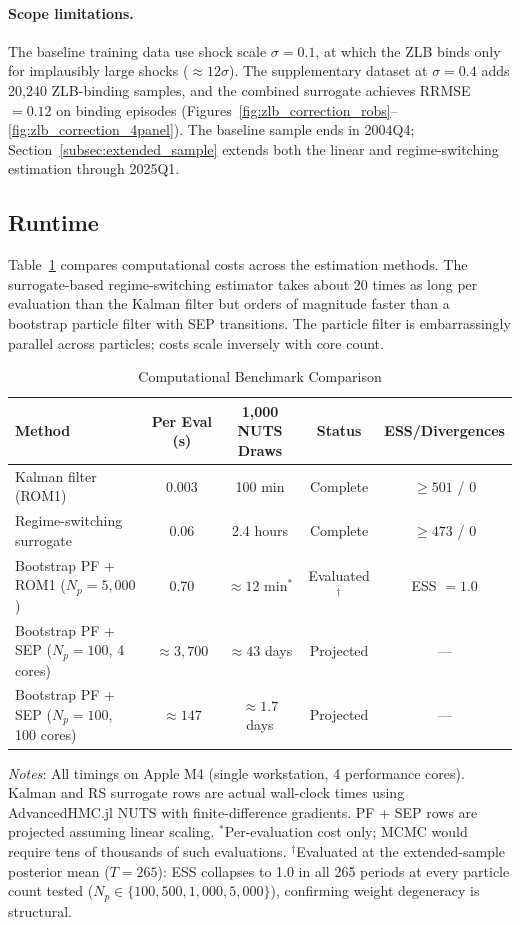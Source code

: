 \documentclass[12pt]{article}
\theoremstyle{plain}
\theoremstyle{definition}
\theoremstyle{remark}
\begin{document}
\paragraph{Scope limitations.} The baseline training data use shock scale $\sigma = 0.1$, at which the ZLB binds only for implausibly large shocks ($\approx 12\sigma$). The supplementary dataset at $\sigma = 0.4$ adds 20,240 ZLB-binding samples, and the combined surrogate achieves RRMSE $= 0.12$ on binding episodes (Figures~\ref{fig:zlb_correction_robs}--\ref{fig:zlb_correction_4panel}). The baseline sample ends in 2004Q4; Section~\ref{subsec:extended_sample} extends both the linear and regime-switching estimation through 2025Q1.

\subsection{Runtime}
\label{subsec:results_hlt_runtime}

Table~\ref{tab:benchmarks} compares computational costs across the estimation methods. The surrogate-based regime-switching estimator takes about 20 times as long per evaluation than the Kalman filter but orders of magnitude faster than a bootstrap particle filter with SEP transitions. The particle filter is embarrassingly parallel across particles; costs scale inversely with core count.

\begin{table}[htbp]
\centering
\caption{Computational Benchmark Comparison}
\label{tab:benchmarks}
\begin{tabular}{lcccc}
\toprule
Method & Per Eval (s) & 1{,}000 NUTS Draws & Status & ESS/Divergences \\
\midrule
Kalman filter (ROM1) & 0.003 & 100 min & Complete & $\geq 501$ / 0 \\
Regime-switching surrogate & 0.06 & 2.4 hours & Complete & $\geq 473$ / 0 \\
Bootstrap PF + ROM1 ($N_p\!=\!5{,}000$) & 0.70 & $\approx 12$ min$^*$ & Evaluated$^\dagger$ & ESS $= 1.0$ \\
Bootstrap PF + SEP ($N_p\!=\!100$, 4 cores) & $\approx 3{,}700$ & $\approx 43$ days & Projected & --- \\
Bootstrap PF + SEP ($N_p\!=\!100$, 100 cores) & $\approx 147$ & $\approx 1.7$ days & Projected & --- \\
\bottomrule
\end{tabular}
\smallskip
{\footnotesize \textit{Notes}: All timings on Apple M4 (single workstation, 4 performance cores). Kalman and RS surrogate rows are actual wall-clock times using AdvancedHMC.jl NUTS with finite-difference gradients. PF + SEP rows are projected assuming linear scaling. $^*$Per-evaluation cost only; MCMC would require tens of thousands of such evaluations. $^\dagger$Evaluated at the extended-sample posterior mean ($T=265$): ESS collapses to 1.0 in all 265 periods at every particle count tested ($N_p \in \{100, 500, 1{,}000, 5{,}000\}$), confirming weight degeneracy is structural.}
\end{table}
\end{document}
